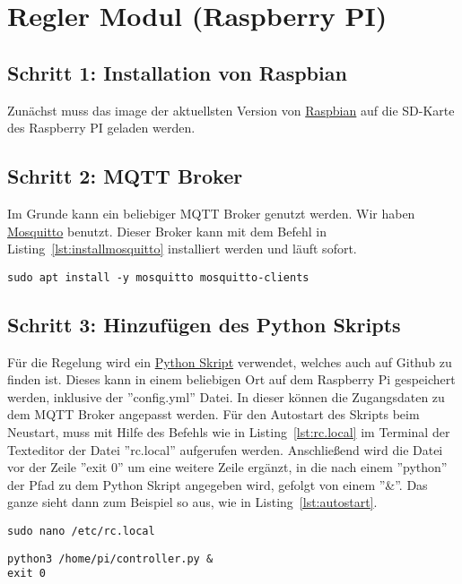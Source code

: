\section{Regler Modul (Raspberry PI)}

\subsection{Schritt 1: Installation von Raspbian}
Zunächst muss das image der aktuellsten Version von \href{https://www.raspberrypi.org/downloads/raspbian/}{Raspbian} auf die SD-Karte des Raspberry PI geladen werden.

\subsection{Schritt 2: MQTT Broker}
Im Grunde kann ein beliebiger MQTT Broker genutzt werden. Wir haben \href{http://mosquitto.org/}{Mosquitto} benutzt. Dieser Broker kann mit dem Befehl in Listing~\ref{lst:installmosquitto} installiert werden und läuft sofort.

\begin{lstlisting}
sudo apt install -y mosquitto mosquitto-clients
\end{lstlisting}

\subsection{Schritt 3: Hinzufügen des Python Skripts}
Für die Regelung wird ein \href{https://github.com/maxbachmann-university/blind-controller}{Python Skript} verwendet, welches auch auf Github zu finden ist. Dieses kann in einem beliebigen Ort auf dem Raspberry Pi gespeichert werden, inklusive der ''config.yml'' Datei. In dieser können die Zugangsdaten zu dem MQTT Broker angepasst werden. Für den Autostart des Skripts beim Neustart, muss mit Hilfe des Befehls wie in Listing~\ref{lst:rc.local} im Terminal der Texteditor der Datei ''rc.local'' aufgerufen werden. Anschließend wird die Datei vor der Zeile ''exit 0'' um eine weitere Zeile ergänzt, in die nach einem ''python'' der Pfad zu dem Python Skript angegeben wird, gefolgt von einem ''\&''. Das ganze sieht dann zum Beispiel so aus, wie in Listing~\ref{lst:autostart}.

\begin{lstlisting}
sudo nano /etc/rc.local
\end{lstlisting}

\lstset{language=Python}
\begin{lstlisting}
python3 /home/pi/controller.py &
exit 0
\end{lstlisting}
